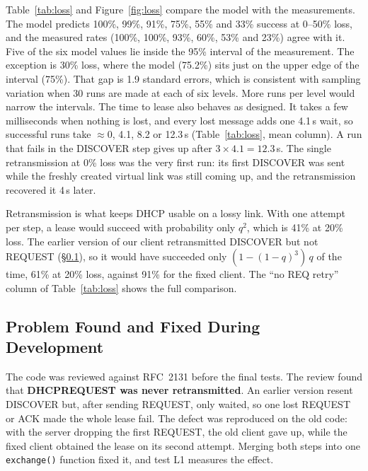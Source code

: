 \documentclass[11pt]{article}
\begin{document}
Table~\ref{tab:loss} and Figure~\ref{fig:loss} compare the model with the measurements.
The model predicts 100\%, 99\%, 91\%, 75\%, 55\% and 33\% success at 0--50\% loss, and
the measured rates (100\%, 100\%, 93\%, 60\%, 53\% and 23\%) agree with it. Five of the six model values lie inside the 95\% interval of the
measurement. The exception is 30\% loss, where the model (75.2\%) sits just on the upper
edge of the interval (75\%). That gap is 1.9 standard errors, which is consistent with
sampling variation when 30 runs are made at each of six levels. More runs per level would
narrow the intervals. The time to lease also behaves as designed.
It takes a few milliseconds when nothing is lost, and every lost message adds one 4.1\,s
wait, so successful runs take $\approx0$, 4.1, 8.2 or 12.3\,s (Table~\ref{tab:loss},
mean column). A run that fails in the DISCOVER step gives up after
$3\times4.1=12.3$\,s. The single retransmission at 0\% loss was the very first run: its
first DISCOVER was sent while the freshly created virtual link was still coming up, and
the retransmission recovered it 4\,s later.

Retransmission is what keeps DHCP usable on a lossy link. With one attempt per step, a
lease would succeed with probability only $q^2$, which is 41\% at 20\% loss. The earlier
version of our client retransmitted DISCOVER but not REQUEST (\S\ref{sec:fixes}), so it
would have succeeded only $(1-(1-q)^3)\,q$ of the time, 61\% at 20\% loss, against 91\%
for the fixed client. The ``no REQ retry'' column of Table~\ref{tab:loss} shows the full
comparison.

\subsection{Problem Found and Fixed During Development}
\label{sec:fixes}
The code was reviewed against RFC~2131 before the final tests. The review found that
\textbf{DHCPREQUEST was never retransmitted}. An earlier version resent DISCOVER but,
after sending REQUEST, only waited, so one lost REQUEST or ACK made the whole lease fail.
The defect was reproduced on the old code: with the server dropping the first REQUEST,
the old client gave up, while the fixed client obtained the lease on its second attempt.
Merging both steps into one \texttt{exchange()} function fixed it, and test L1 measures
the effect.
\end{document}
